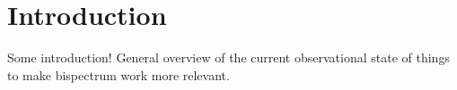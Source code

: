 \chapter{Introduction}
\label{chapter:introgen}

Some introduction! General overview of the current observational state of things to make bispectrum work more relevant.